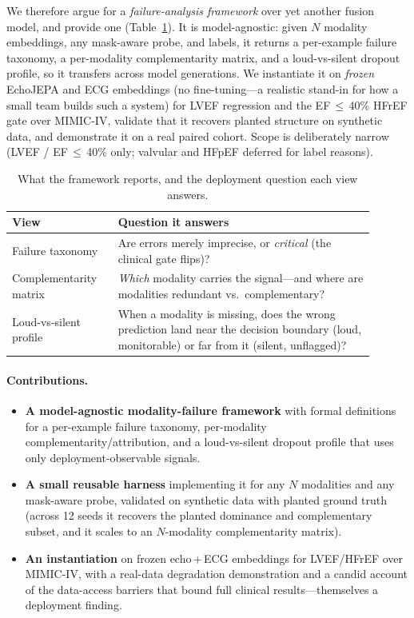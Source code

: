 \documentclass{article}
\begin{document}
We therefore argue for a \emph{failure-analysis framework} over yet another fusion model, and
provide one (Table~\ref{tab:pillars}). It is model-agnostic: given $N$ modality embeddings, any
mask-aware probe, and labels, it returns a per-example failure taxonomy, a per-modality
complementarity matrix, and a loud-vs-silent dropout profile, so it transfers across model
generations. We instantiate it on \emph{frozen} EchoJEPA and ECG embeddings (no fine-tuning---a
realistic stand-in for how a small team builds such a system) for LVEF regression and the
\mbox{EF\,$\leq$\,40\%} HFrEF gate over MIMIC-IV, validate that it recovers planted structure on
synthetic data, and demonstrate it on a real paired cohort. Scope is deliberately narrow
(LVEF / \mbox{EF\,$\leq$\,40\%} only; valvular and HFpEF deferred for label reasons).

\begin{table}[t]
\centering
\caption{What the framework reports, and the deployment question each view answers.}
\label{tab:pillars}
\small
\begin{tabular}{@{}p{0.26\linewidth}p{0.64\linewidth}@{}}
\toprule
\textbf{View} & \textbf{Question it answers} \\
\midrule
Failure taxonomy & Are errors merely imprecise, or \emph{critical} (the clinical gate flips)? \\
Complementarity matrix & \emph{Which} modality carries the signal---and where are modalities redundant vs.\ complementary? \\
Loud-vs-silent profile & When a modality is missing, does the wrong prediction land near the decision boundary (loud, monitorable) or far from it (silent, unflagged)? \\
\bottomrule
\end{tabular}
\end{table}

\paragraph{Contributions.}
\begin{itemize}
  \item \textbf{A model-agnostic modality-failure framework} with formal definitions for a
        per-example failure taxonomy, per-modality complementarity/attribution, and a
        loud-vs-silent dropout profile that uses only deployment-observable signals.
  \item \textbf{A small reusable harness} implementing it for any $N$ modalities and any
        mask-aware probe, validated on synthetic data with planted ground truth (across 12 seeds it
        recovers the planted dominance and complementary subset, and it scales to an $N$-modality
        complementarity matrix).
  \item \textbf{An instantiation} on frozen echo\,+\,ECG embeddings for LVEF/HFrEF over MIMIC-IV,
        with a real-data degradation demonstration and a candid account of the data-access barriers
        that bound full clinical results---themselves a deployment finding.
\end{itemize}
\end{document}
